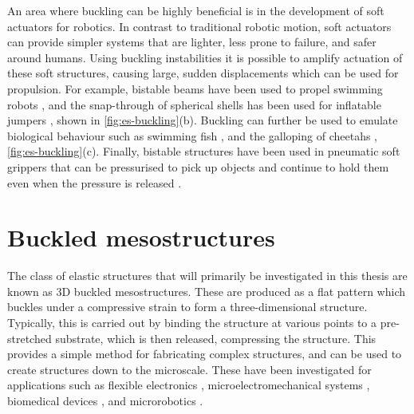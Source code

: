 
An area where buckling can be highly beneficial is in the development of soft actuators for robotics.
In contrast to traditional robotic motion, soft actuators can provide simpler systems that are lighter, less prone to failure, and safer around humans.
Using buckling instabilities it is possible to amplify actuation of these soft structures, causing large, sudden displacements which can be used for propulsion.
For example, bistable beams have been used to propel swimming robots \cite{Chen2018a}, and the snap-through of spherical shells has been used for inflatable jumpers \cite{Gorissen2020}, shown in \cref{fig:es-buckling}(b).
Buckling can further be used to emulate biological behaviour such as swimming fish \cite{Currier2020}, and the galloping of cheetahs \cite{Tang2020}, \cref{fig:es-buckling}(c).
Finally, bistable structures have been used in pneumatic soft grippers that can be pressurised to pick up objects and continue to hold them even when the pressure is released \cite{Yang2015,Faber2020}.



\section{Buckled mesostructures}\label{sec:es-mesostructures}
The class of elastic structures that will primarily be investigated in this thesis are known as 3D buckled mesostructures.
These are produced as a flat pattern which buckles under a compressive strain to form a three-dimensional structure.
Typically, this is carried out by binding the structure at various points to a pre-stretched substrate, which is then released, compressing the structure.
This provides a simple method for fabricating complex structures, and can be used to create structures down to the microscale.
These have been investigated for applications such as flexible electronics \cite{Fu2018}, microelectromechanical systems \cite{Fu2018,Ning2018}, biomedical devices \cite{McCracken2017,Yan2017}, and microrobotics \cite{Yan2017}.

